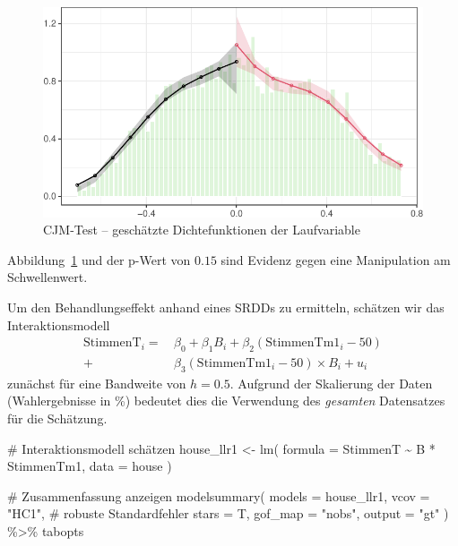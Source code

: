 \documentclass[
  a4paper,
  DIV=11,
  oneside]{scrreprt}
\newenvironment{Shaded}{\begin{snugshade}}{\end{snugshade}}
\newcommand{\AttributeTok}[1]{\textcolor[rgb]{0.40,0.45,0.13}{#1}}
\newcommand{\CommentTok}[1]{\textcolor[rgb]{0.37,0.37,0.37}{#1}}
\newcommand{\FunctionTok}[1]{\textcolor[rgb]{0.28,0.35,0.67}{#1}}
\newcommand{\NormalTok}[1]{\textcolor[rgb]{0.00,0.23,0.31}{#1}}
\newcommand{\OtherTok}[1]{\textcolor[rgb]{0.00,0.23,0.31}{#1}}
\newcommand{\SpecialCharTok}[1]{\textcolor[rgb]{0.37,0.37,0.37}{#1}}
\newcommand{\StringTok}[1]{\textcolor[rgb]{0.13,0.47,0.30}{#1}}
\begin{document}
\begin{figure}[t]

{\centering \includegraphics{RDD_files/figure-pdf/fig-cjm-lee-1.pdf}

}

\caption{\label{fig-cjm-lee}CJM-Test -- geschätzte Dichtefunktionen der
Laufvariable}

\end{figure}

Abbildung~\ref{fig-cjm-lee} und der p-Wert von \(0.15\) sind Evidenz
gegen eine Manipulation am Schwellenwert.

Um den Behandlungseffekt anhand eines SRDDs zu ermitteln, schätzen wir
das Interaktionsmodell \begin{align*}
  \text{StimmenT}_i =&\, \beta_0 + \beta_1 B_i + \beta_2 (\text{StimmenTm1}_i - 50)\\ 
  +&\, \beta_3(\text{StimmenTm1}_i - 50)\times B_i + u_i
\end{align*} zunächst für eine Bandweite von \(h = 0.5\). Aufgrund der
Skalierung der Daten (Wahlergebnisse in \%) bedeutet dies die Verwendung
des \emph{gesamten} Datensatzes für die Schätzung.

\begin{Shaded}
\begin{Highlighting}[]
\CommentTok{\# Interaktionsmodell schätzen}
\NormalTok{house\_llr1 }\OtherTok{\textless{}{-}} \FunctionTok{lm}\NormalTok{(}
  \AttributeTok{formula =}\NormalTok{ StimmenT }\SpecialCharTok{\textasciitilde{}}\NormalTok{ B }\SpecialCharTok{*}\NormalTok{ StimmenTm1, }
  \AttributeTok{data =}\NormalTok{ house}
\NormalTok{)}

\CommentTok{\# Zusammenfassung anzeigen  }
\FunctionTok{modelsummary}\NormalTok{(}
  \AttributeTok{models =}\NormalTok{ house\_llr1, }
  \AttributeTok{vcov =} \StringTok{"HC1"}\NormalTok{, }\CommentTok{\# robuste Standardfehler}
  \AttributeTok{stars =}\NormalTok{ T, }
  \AttributeTok{gof\_map =} \StringTok{"nobs"}\NormalTok{, }
  \AttributeTok{output =} \StringTok{"gt"}
\NormalTok{) }\SpecialCharTok{\%\textgreater{}\%} 
\NormalTok{  tabopts}
\end{Highlighting}
\end{Shaded}
\end{document}
